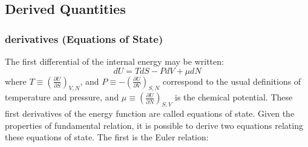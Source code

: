 \documentclass[twocolumn,10pt]{asme2ej}
\begin{document}
\subsection{Derived Quantities}

\subsubsection{ derivatives (Equations of State)}
The first differential of the internal energy may be written:
\[dU = TdS - PdV + \mu dN\]
where %
$T \equiv {\left( {\frac{{\partial U}}{{\partial S}}} \right)_{V,N}}$, 
and %
$P \equiv  - {\left( {\frac{{\partial U}}{{\partial V}}} \right)_{S,N}}$
correspond to the usual definitions of temperature and pressure, and 
$\mu  \equiv {\left( {\frac{{\partial U}}{{\partial N}}} \right)_{S,V}}$
is the chemical potential. These first derivatives of the energy function are called equations of state. 
Given the properties of fundamental relation, it is possible to derive two equations relating these equations of state. The first is the Euler relation:
\end{document}
